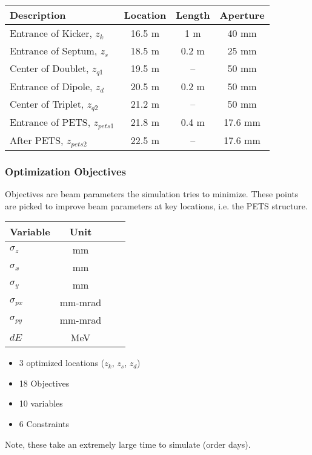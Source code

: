 \documentclass[professionalfonts,t]{beamer}
\begin{document}
\begin{frame}
\vspace{1em}
\begin{minipage}{0.55\textwidth}
	\begin{table}[hbt] 
	\centering
	\begin{tabular}{ l *{3}{c}}
		\toprule
		\textbf{Description} & \textbf{Location} & \textbf{Length} & \textbf{Aperture}\\
		\midrule
		Entrance of Kicker, 	$ z_k$ 		& 16.5 m & 1 m   & 40 mm\\
		Entrance of Septum, 	$ z_s$  	& 18.5 m & 0.2 m & 25 mm\\
		Center of Doublet, 		$ z_{q1}$	& 19.5 m & -- 	 & 50 mm\\
		Entrance of Dipole, 	$ z_d$  	& 20.5 m & 0.2 m & 50 mm\\
		Center of Triplet,		$ z_{q2}$	& 21.2 m & --    & 50 mm\\
		Entrance of PETS, $z_{pets1}$  & 21.8 m & 0.4 m 	 & 17.6 mm\\
		After PETS, 			$z_{pets2}$ & 22.5 m &  --   & 17.6 mm\\
		\bottomrule	
	\end{tabular}	
\end{table}
\end{minipage}
\end{frame}
\begin{frame}
	\frametitle{Optimization Objectives}
	Objectives are beam parameters the simulation tries to minimize.
	These points are picked to improve beam parameters at key locations, 
	i.e. the PETS structure.
	
	\vspace{1em}
\begin{minipage}{0.45\textwidth}
		\begin{table}[hbt] 
		\centering
		\begin{tabular}{ l *{3}{c}}
			\toprule
			\textbf{Variable} &  \textbf{Unit} \\
			\midrule
			$\sigma_z$ 		& mm \\
			$\sigma_{x}$ 	& mm \\
			$\sigma_y$ 		& mm \\
			$\sigma_{px}$ 	& mm-mrad \\
			$\sigma_{py}$ 	& mm-mrad \\
			$dE$			& MeV\\
			\bottomrule	
		\end{tabular}	
	\end{table}
\end{minipage}
\begin{minipage}{0.45\textwidth}
	\begin{itemize}
		\item 3 optimized locations ($z_k$, $z_s$, $z_d$)
		\item 18 Objectives
		\item 10 variables 
		\item 6 Constraints
	\end{itemize}
\end{minipage}
\centering
Note, these take an extremely large time to simulate (order days).
\end{frame}
\end{document}
